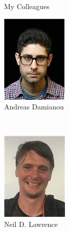 \documentclass[13pt,aspectratio=1610]{beamer}
\begin{document}
\begin{frame}{My Colleagues}
\begin{minipage}{0.3\textwidth}
\includegraphics[width=.8\textwidth]{andreas.jpeg} \\
Andreas Damianou
\end{minipage} ~
\begin{minipage}{0.3\textwidth}
\centering 
\includegraphics[width=.81\textwidth]{neil.jpeg} \\
Neil D. Lawrence
\end{minipage}

\end{frame}
\end{document}
